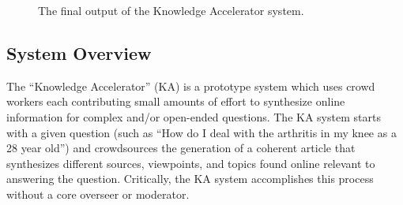 \begin{figure}
    \centering
    \caption{The final output of the Knowledge Accelerator system.}
    \label{fig:final_answer}
\end{figure}



\subsection{System Overview}
The ``Knowledge Accelerator'' (KA) is a prototype system which uses crowd workers each contributing small amounts of effort to synthesize online information for complex and/or open-ended questions. The KA system starts with a given question (such as ``How do I deal with the arthritis in my knee as a 28 year old'') and crowdsources the generation of a coherent article that synthesizes different sources, viewpoints, and topics found online relevant to answering the question. Critically, the KA system accomplishes this process without a core overseer or moderator. 

